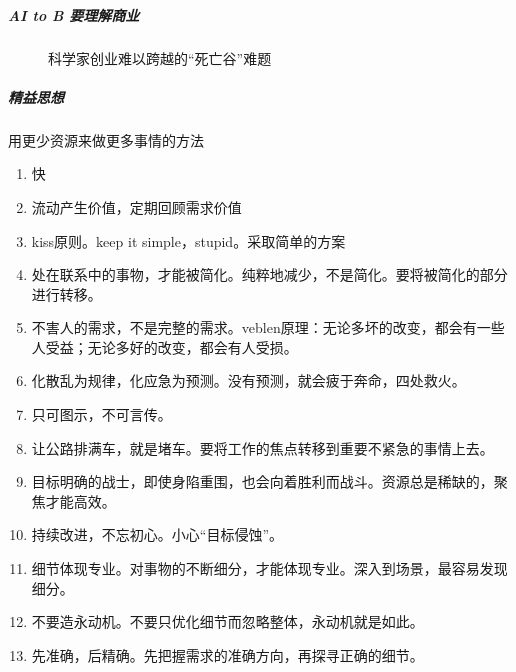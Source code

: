 \documentclass[letterpaper,11pt,english]{sphinxmanual}
\begin{document}
\subparagraph{AI to B 要理解商业}
\label{\detokenize{chapter_idea/business:ai-to-b}}
\begin{figure}[H]
\centering
\capstart

\noindent{}
\caption{科学家创业难以跨越的“死亡谷”难题}\label{\detokenize{chapter_idea/business:id29}}\end{figure}


\subparagraph{精益思想}
\label{\detokenize{chapter_idea/business:id4}}
用更少资源来做更多事情的方法
\begin{enumerate}
%
\item {} 
快

\item {} 
流动产生价值，定期回顾需求价值

\item {} 
kiss原则。keep it simple，stupid。采取简单的方案

\item {} 
处在联系中的事物，才能被简化。纯粹地减少，不是简化。要将被简化的部分进行转移。

\item {} 
不害人的需求，不是完整的需求。veblen原理：无论多坏的改变，都会有一些人受益；无论多好的改变，都会有人受损。

\item {} 
化散乱为规律，化应急为预测。没有预测，就会疲于奔命，四处救火。

\item {} 
只可图示，不可言传。

\item {} 
让公路排满车，就是堵车。要将工作的焦点转移到重要不紧急的事情上去。

\item {} 
目标明确的战士，即使身陷重围，也会向着胜利而战斗。资源总是稀缺的，聚焦才能高效。

\item {} 
持续改进，不忘初心。小心“目标侵蚀”。

\item {} 
细节体现专业。对事物的不断细分，才能体现专业。深入到场景，最容易发现细分。

\item {} 
不要造永动机。不要只优化细节而忽略整体，永动机就是如此。

\item {} 
先准确，后精确。先把握需求的准确方向，再探寻正确的细节。

\end{enumerate}
\end{document}

